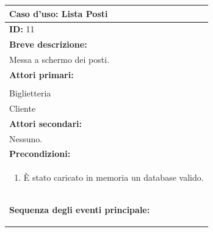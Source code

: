 \documentclass{article}
\begin{document}
                \begin{table}[H]
                    \begin{tabular}{|p{\linewidth}|}
                        \hline
                        \cellcolor{gray!100}
                        \color{white}
                        \centerline{\textbf{Caso d'uso:} Lista Posti} \\
                        \hline
                        \textbf{ID:} 11 \\
                        \hline
                        \cellcolor{gray!20}
                        \textbf{Breve descrizione:} \\
                        \cellcolor{gray!20}
                        Messa a schermo dei posti. \\
                        \hline
                        \textbf{Attori primari:} \\
                        \begin{minipage}{\linewidth}
                            Amministratore \\
                            Biglietteria \\ 
                            Cliente
                        \end{minipage}
                        \vspace{0pt} \\ 
                        \hline
                        \textbf{Attori secondari:} \\
                        Nessuno. \\
                        \hline
                        \cellcolor{gray!20}
                        \textbf{Precondizioni:} \\
                        \cellcolor{gray!20}
                        \begin{minipage}{\linewidth}
                            \begin{enumerate}
                                \item È stato caricato in memoria un database valido. 
                            \end{enumerate}
                        \end{minipage} 
                        \vspace{-10pt} \\
                        \hline
                        \textbf{Sequenza degli eventi principale:}
                        \begin{enumerate}

\end{enumerate}
\end{tabular}
\end{table}
\end{document}
